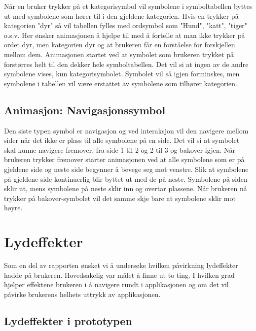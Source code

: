 { 
Når en bruker trykker på et kategorisymbol vil symbolene i symboltabellen byttes ut med symbolene som hører til i den gjeldene kategorien. Hvis en trykker på kategorien "dyr" så vil tabellen fylles med ordsymbol som "Hund", "katt", "tiger" o.s.v. Her ønsker animasjonen å hjelpe til med å fortelle at man ikke trykker på ordet dyr, men kategorien dyr og at brukeren får en forståelse for forskjellen mellom dem. Animasjonen startet ved at symbolet som brukeren trykket på forstørres helt til den dekker hele symboltabellen. Det vil si at ingen av de andre symbolene vises, kun kategorisymbolet. Symbolet vil så igjen forminskes, men symbolene i tabellen vil være erstattet av symbolene som tilhører kategorien.  
 
 
 
 
\subsection{Animasjon: Navigasjonssymbol} 
 
 
Den siste typen symbol er navigasjon og ved interaksjon vil den navigere mellom sider når det ikke er plass til alle symbolene på en side. Det vil si at symbolet skal kunne navigere fremover, fra side 1 til 2 og 2 til 3 og bakover igjen. Når brukeren trykker fremover starter animasjonen ved at alle symbolene som er på gjeldene side og neste side begynner å bevege seg mot venstre. Slik at symbolene på gjeldene side kontinuerlig blir byttet ut med de på neste. Symbolene på siden sklir ut, mens symbolene på neste sklir inn og overtar plassene. Når brukeren nå trykker på bakover-symbolet vil det samme skje bare at symbolene sklir mot høyre. 
 
 
\section{Lydeffekter} 
 
 
Som en del av rapporten ønsket vi å undersøke hvilken påvirkning lydeffekter hadde på brukeren. Hovedsakelig var målet å finne ut to ting. I hvilken grad hjelper effektene brukeren i å navigere rundt i applikasjonen og om det vil påvirke brukerens helhets uttrykk av applikasjonen.  
 
 
\subsection{Lydeffekter i prototypen} 
 
}
